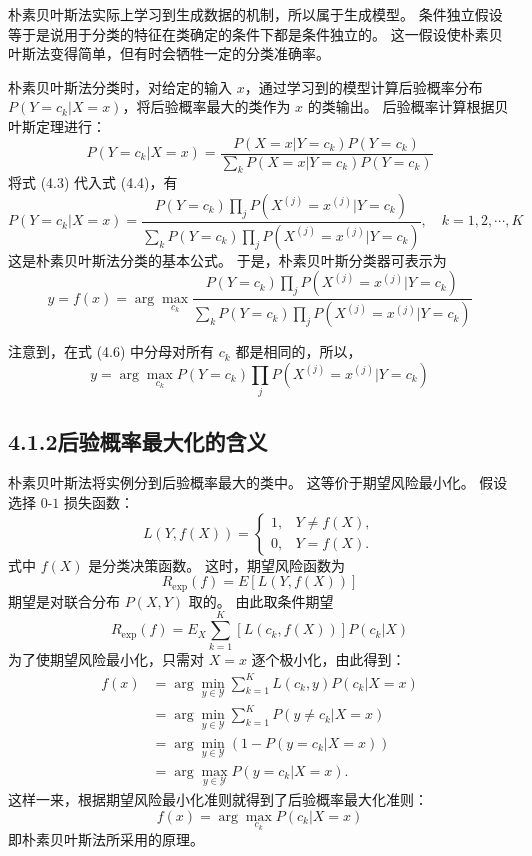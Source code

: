 \documentclass[UTF8,12pt,a4paper,fontset=fandol]{ctexart}
\begin{document}
朴素贝叶斯法实际上学习到生成数据的机制，所以属于生成模型。
条件独立假设等于是说用于分类的特征在类确定的条件下都是条件独立的。
这一假设使朴素贝叶斯法变得简单，但有时会牺牲一定的分类准确率。

朴素贝叶斯法分类时，对给定的输入 $x$，通过学习到的模型计算后验概率分布 $P(Y=c_k|X=x)$，将后验概率最大的类作为 $x$ 的类输出。
后验概率计算根据贝叶斯定理进行：
\begin{equation}
  P(Y=c_k|X=x)
  =
  \frac{P(X=x|Y=c_k)P(Y=c_k)}
       {\sum_k P(X=x|Y=c_k)P(Y=c_k)}
  \tag{4.4}
\end{equation}
将式 (4.3) 代入式 (4.4)，有
\begin{equation}
  P(Y=c_k|X=x)
  =
  \frac{P(Y=c_k)\prod_j P(X^{(j)}=x^{(j)}|Y=c_k)}
       {\sum_k P(Y=c_k)\prod_j P(X^{(j)}=x^{(j)}|Y=c_k)},
  \quad k=1,2,\cdots,K
  \tag{4.5}
\end{equation}
这是朴素贝叶斯法分类的基本公式。
于是，朴素贝叶斯分类器可表示为
\begin{equation}
  y=f(x)=\arg\max_{c_k}
  \frac{P(Y=c_k)\prod_j P(X^{(j)}=x^{(j)}|Y=c_k)}
       {\sum_k P(Y=c_k)\prod_j P(X^{(j)}=x^{(j)}|Y=c_k)}
  \tag{4.6}
\end{equation}

注意到，在式 (4.6) 中分母对所有 $c_k$ 都是相同的，所以，
\begin{equation}
  y=\arg\max_{c_k} P(Y=c_k)\prod_j P(X^{(j)}=x^{(j)}|Y=c_k)
  \tag{4.7}
\end{equation}

\subsection*{4.1.2\quad 后验概率最大化的含义}

朴素贝叶斯法将实例分到后验概率最大的类中。
这等价于期望风险最小化。
假设选择 $0$-$1$ 损失函数：
\[
  L(Y,f(X))=
  \begin{cases}
    1, & Y\ne f(X),\\
    0, & Y=f(X).
  \end{cases}
\]
式中 $f(X)$ 是分类决策函数。
这时，期望风险函数为
\[
  R_{\mathrm{exp}}(f)=E[L(Y,f(X))]
\]
期望是对联合分布 $P(X,Y)$ 取的。
由此取条件期望
\[
  R_{\mathrm{exp}}(f)=E_X\sum_{k=1}^K [L(c_k,f(X))]P(c_k|X)
\]
为了使期望风险最小化，只需对 $X=x$ 逐个极小化，由此得到：
\[
\begin{aligned}
  f(x)
  &=\arg\min_{y\in\mathcal{Y}}\sum_{k=1}^K L(c_k,y)P(c_k|X=x) \\
  &=\arg\min_{y\in\mathcal{Y}}\sum_{k=1}^K P(y\ne c_k|X=x) \\
  &=\arg\min_{y\in\mathcal{Y}}(1-P(y=c_k|X=x)) \\
  &=\arg\max_{y\in\mathcal{Y}}P(y=c_k|X=x).
\end{aligned}
\]
这样一来，根据期望风险最小化准则就得到了后验概率最大化准则：
\[
  f(x)=\arg\max_{c_k}P(c_k|X=x)
\]
即朴素贝叶斯法所采用的原理。
\end{document}
